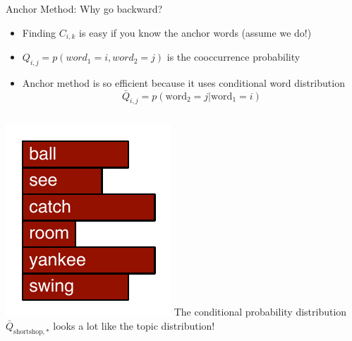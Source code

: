 \documentclass[compress]{beamer}
\begin{document}
\begin{frame}{Anchor Method: Why go backward?}

\begin{itemize}
  \item Finding $C_{i,k}$ is easy if you know the anchor words (assume we do!)
  \item $Q_{i,j} = p(word_1 = i, word_2 = j)$ is the cooccurrence probability
  \item Anchor method is so efficient because it uses conditional word distribution
  \begin{equation*}
    \bar Q_{i,j} = p(\mbox{word}_2=j | \mbox{word}_1=i)
  \end{equation*}

\end{itemize}

\pause

\begin{columns}
    \includegraphics[width=0.7\linewidth]{spectral/shortstop}
    The conditional probability distribution $\bar Q_{\mbox{shortshop},*}$ looks a lot like the topic distribution!
\end{columns}


\end{frame}
\end{document}
